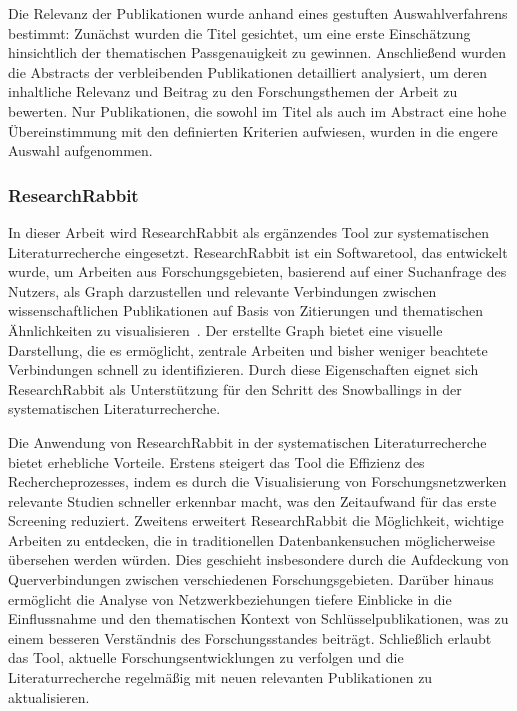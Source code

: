 Die Relevanz der Publikationen wurde anhand eines gestuften Auswahlverfahrens bestimmt: Zunächst wurden die Titel gesichtet, 
um eine erste Einschätzung hinsichtlich der thematischen Passgenauigkeit zu gewinnen. Anschließend wurden die Abstracts der 
verbleibenden Publikationen detailliert analysiert, um deren inhaltliche Relevanz und Beitrag zu den Forschungsthemen der 
Arbeit zu bewerten. Nur Publikationen, die sowohl im Titel als auch im Abstract eine hohe Übereinstimmung mit den definierten 
Kriterien aufwiesen, wurden in die engere Auswahl aufgenommen. 

\subsubsection{ResearchRabbit}
In dieser Arbeit wird ResearchRabbit als ergänzendes Tool zur systematischen Literaturrecherche eingesetzt. 
ResearchRabbit ist ein Softwaretool, das entwickelt wurde, um Arbeiten aus Forschungsgebieten, basierend auf einer 
Suchanfrage des Nutzers, als Graph darzustellen und relevante Verbindungen zwischen wissenschaftlichen Publikationen auf Basis von Zitierungen und thematischen 
Ähnlichkeiten zu visualisieren~\cite{cole2023researchrabbit}. Der erstellte Graph bietet eine visuelle Darstellung, die es ermöglicht, 
zentrale Arbeiten und bisher weniger beachtete Verbindungen schnell zu identifizieren. Durch diese Eigenschaften eignet sich 
ResearchRabbit als Unterstützung für den Schritt des Snowballings in der systematischen Literaturrecherche. 

Die Anwendung von ResearchRabbit in der systematischen Literaturrecherche bietet erhebliche Vorteile. Erstens 
steigert das Tool die Effizienz des Rechercheprozesses, indem es durch die Visualisierung von Forschungsnetzwerken 
relevante Studien schneller erkennbar macht, was den Zeitaufwand für das erste Screening reduziert. Zweitens 
erweitert ResearchRabbit die Möglichkeit, wichtige Arbeiten zu entdecken, die in traditionellen Datenbankensuchen 
möglicherweise übersehen werden würden. Dies geschieht insbesondere durch die Aufdeckung von Querverbindungen 
zwischen verschiedenen Forschungsgebieten. Darüber hinaus ermöglicht die Analyse von Netzwerkbeziehungen 
tiefere Einblicke in die Einflussnahme und den thematischen Kontext von Schlüsselpublikationen, was zu einem 
besseren Verständnis des Forschungsstandes beiträgt. Schließlich erlaubt das Tool, aktuelle Forschungsentwicklungen 
zu verfolgen und die Literaturrecherche regelmäßig mit neuen relevanten Publikationen zu aktualisieren.

